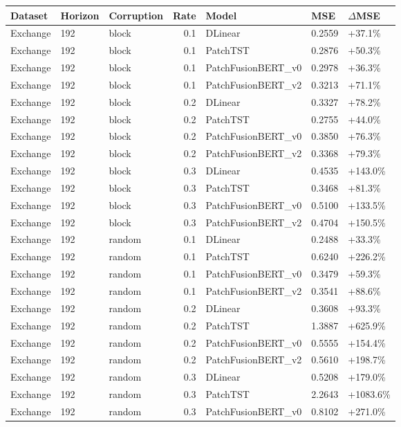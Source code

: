 \begin{tabular}{lllrlll}
\toprule
Dataset & Horizon & Corruption & Rate & Model & MSE & $\Delta$MSE \\
\midrule
Exchange & 192 & block & 0.1 & DLinear & 0.2559 & +37.1\% \\
Exchange & 192 & block & 0.1 & PatchTST & 0.2876 & +50.3\% \\
Exchange & 192 & block & 0.1 & PatchFusionBERT_v0 & 0.2978 & +36.3\% \\
Exchange & 192 & block & 0.1 & PatchFusionBERT_v2 & 0.3213 & +71.1\% \\
Exchange & 192 & block & 0.2 & DLinear & 0.3327 & +78.2\% \\
Exchange & 192 & block & 0.2 & PatchTST & 0.2755 & +44.0\% \\
Exchange & 192 & block & 0.2 & PatchFusionBERT_v0 & 0.3850 & +76.3\% \\
Exchange & 192 & block & 0.2 & PatchFusionBERT_v2 & 0.3368 & +79.3\% \\
Exchange & 192 & block & 0.3 & DLinear & 0.4535 & +143.0\% \\
Exchange & 192 & block & 0.3 & PatchTST & 0.3468 & +81.3\% \\
Exchange & 192 & block & 0.3 & PatchFusionBERT_v0 & 0.5100 & +133.5\% \\
Exchange & 192 & block & 0.3 & PatchFusionBERT_v2 & 0.4704 & +150.5\% \\
Exchange & 192 & random & 0.1 & DLinear & 0.2488 & +33.3\% \\
Exchange & 192 & random & 0.1 & PatchTST & 0.6240 & +226.2\% \\
Exchange & 192 & random & 0.1 & PatchFusionBERT_v0 & 0.3479 & +59.3\% \\
Exchange & 192 & random & 0.1 & PatchFusionBERT_v2 & 0.3541 & +88.6\% \\
Exchange & 192 & random & 0.2 & DLinear & 0.3608 & +93.3\% \\
Exchange & 192 & random & 0.2 & PatchTST & 1.3887 & +625.9\% \\
Exchange & 192 & random & 0.2 & PatchFusionBERT_v0 & 0.5555 & +154.4\% \\
Exchange & 192 & random & 0.2 & PatchFusionBERT_v2 & 0.5610 & +198.7\% \\
Exchange & 192 & random & 0.3 & DLinear & 0.5208 & +179.0\% \\
Exchange & 192 & random & 0.3 & PatchTST & 2.2643 & +1083.6\% \\
Exchange & 192 & random & 0.3 & PatchFusionBERT_v0 & 0.8102 & +271.0\% \\

\end{tabular}
